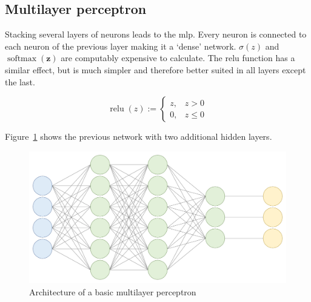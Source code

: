 \subsection{Multilayer perceptron}
Stacking several layers of neurons leads to the \gls{mlp}. Every neuron is connected to each neuron of the previous layer making it a `dense' network.
$\sigma(z)$ and $\operatorname{softmax}(\mathbf{z})$ are computably expensive to calculate. The \gls{relu} function has a similar effect, but is much simpler and therefore better suited in all layers except the last.

\begin{equation}
\operatorname{relu}(z) := \begin{cases}z,&z>0\\0,&z\leq 0\end{cases}
\end{equation}

Figure~\ref{fig:mlp_architecture} shows the previous network with two additional hidden layers.

\begin{figure}[H]
    \begin{center}
    \includegraphics[width=15cm]{../images/mlp_architecture.png}
    \caption{Architecture of a basic multilayer perceptron}\label{fig:mlp_architecture}
    \end{center}
\end{figure}



